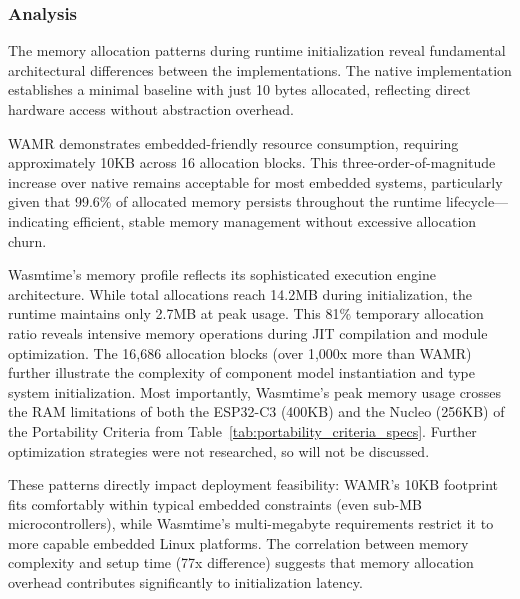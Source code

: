 \subsubsection{Analysis}

The memory allocation patterns during runtime initialization reveal fundamental architectural differences between the implementations. The native implementation establishes a minimal baseline with just 10 bytes allocated, reflecting direct hardware access without abstraction overhead.

WAMR demonstrates embedded-friendly resource consumption, requiring approximately 10KB across 16 allocation blocks. This three-order-of-magnitude increase over native remains acceptable for most embedded systems, particularly given that 99.6\% of allocated memory persists throughout the runtime lifecycle—indicating efficient, stable memory management without excessive allocation churn.

Wasmtime's memory profile reflects its sophisticated execution engine architecture. While total allocations reach 14.2MB during initialization, the runtime maintains only 2.7MB at peak usage. This 81\% temporary allocation ratio reveals intensive memory operations during JIT compilation and module optimization. The 16,686 allocation blocks (over 1,000x more than WAMR) further illustrate the complexity of component model instantiation and type system initialization. Most importantly, Wasmtime's peak memory usage crosses the RAM limitations of both the ESP32-C3 (400KB) and the Nucleo (256KB) of the Portability Criteria from Table~\ref{tab:portability_criteria_specs}. Further optimization strategies were not researched, so will not be discussed.

These patterns directly impact deployment feasibility: WAMR's 10KB footprint fits comfortably within typical embedded constraints (even sub-MB microcontrollers), while Wasmtime's multi-megabyte requirements restrict it to more capable embedded Linux platforms. The correlation between memory complexity and setup time (77x difference) suggests that memory allocation overhead contributes significantly to initialization latency.


